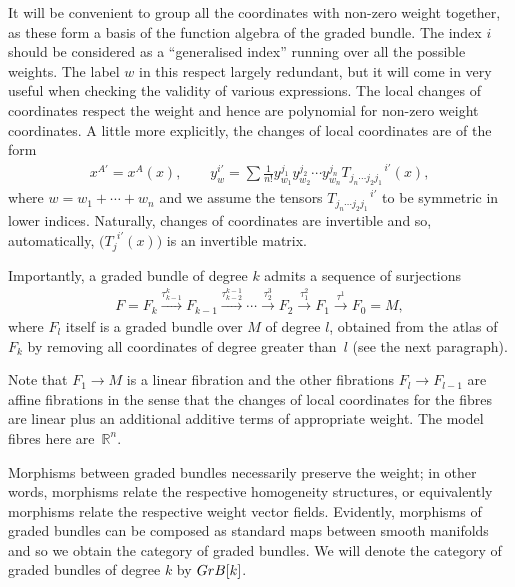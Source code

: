 \documentclass[11pt]{article}
\newcommand{\catname}[1]{\textnormal{\texttt{#1}}}
\newcommand{\GrB}{\catname{GrB}}
\numberwithin{equation}{section}
\begin{document}
It will be convenient to group all the coordinates with non-zero weight together, as these form a basis of the function algebra of the graded bundle. The index $i$ should be considered as a ``generalised index'' running over all the possible weights. The label $w$ in this respect largely redundant, but it will come in very useful when checking the validity of various expressions. The local changes of coordinates respect the weight and hence are polynomial for non-zero weight coordinates. A little more explicitly, the changes of local coordinates are of the form
\begin{gather*}
 x^{A'} = x^{A}(x), \qquad y^{i'}_{w} = \sum \frac{1}{n!} y^{j_{1}}_{w_{1}} y^{j_{2}}_{w_{2}} \cdots y^{j_{n}}_{w_{n}}T_{j_{n} \cdots j_{2} j_{1}}^{\:\:\:\:\:\:\:\:\:\:\:\: \:\:\:\: i'}(x), \end{gather*}
where $w=w_1+\cdots+w_n$ and we assume the tensors $T_{j_{n} \cdots j_{2} j_{1}}^{\:\:\:\:\:\:\:\:\:\:\:\: \:\:\:\: i'}$ to be symmetric in lower indices. Naturally, changes of coordinates are invertible and so, automatically, $\big(T_{j}^{\:\: i'}(x)\big)$ is an invertible matrix.

Importantly, a graded bundle of degree $k$ admits a sequence of surjections
\begin{gather}\label{eqn:fibrations}
F=F_{k} \stackrel{\tau^{k}_{k-1}}{\longrightarrow} F_{k-1} \stackrel{\tau^{k-1}_{k-2}}{\longrightarrow} \cdots \stackrel{\tau^{3}_2}{\longrightarrow} F_{2} \stackrel{\tau^{2}_1}{\longrightarrow}F_{1} \stackrel{\tau^{1}}{\longrightarrow} F_{0} = M,
\end{gather}
where $F_l$ itself is a graded bundle over $M$ of degree $l$, obtained from the atlas of $F_k$ by removing all coordinates of degree greater than~$l$ (see the next paragraph).

Note that $F_{1} \rightarrow M$ is a linear f\/ibration and the other f\/ibrations $F_{l} \rightarrow F_{l-1}$ are af\/f\/ine f\/ibrations in the sense that the changes of local coordinates for the f\/ibres are linear plus an additional additive terms of appropriate weight. The model f\/ibres here are~$\mathbb{R}^{n}$.

Morphisms between graded bundles necessarily preserve the weight; in other words, morphisms relate the respective homogeneity structures, or equivalently morphisms relate the respective weight vector f\/ields. Evidently, morphisms of graded bundles can be composed as standard maps between smooth manifolds and so we obtain the category of graded bundles. We will denote the category of graded bundles of degree $k$ by $\GrB[k]$.
\end{document}

